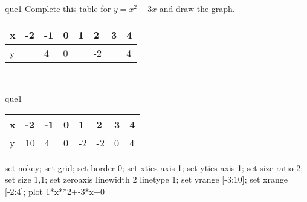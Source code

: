 \documentclass[13.5pt, varwidth=true]{beamer}
\begin{document}
\begin{frame}[shrink=19,fragile]
	\begin{beamercolorbox}[rounded=true, left, shadow=true,wd=14.8cm]{que1}
		 Complete this table for $y = x^{2} - 3x$ and draw the graph. \\[0.3cm] \renewcommand{\arraystretch}{1.2}\begin{tabular}{|C|C|C|C|C|C|C|C|} \hline x & -2 & -1 & 0 & 1 & 2 & 3 & 4 \\ \hline y &  & 4 & 0 &  & -2 &  & 4\\ \hline \end{tabular}\\[0.3cm]
	\end{beamercolorbox}
\end{frame}
\begin{frame}[shrink=19,fragile]
	\begin{beamercolorbox}[rounded=true, left, shadow=true,wd=14.8cm]{que1}
		\renewcommand{\arraystretch}{1.2}\begin{tabular}{|C|C|C|C|C|C|C|C|} \hline x & -2 & -1 & 0 & 1 & 2 & 3 & 4 \\ \hline y & 10 & 4 & 0 & -2 & -2 & 0 & 4\\ \hline \end{tabular}\begin{gnuplot}[terminal=pdf] set nokey; set grid; set border 0; set xtics axis 1; set ytics axis 1; set size ratio 2; set size 1,1; set zeroaxis linewidth 2 linetype 1; set yrange [-3:10]; set xrange [-2:4]; plot 1*x**2+-3*x+0 \end{gnuplot}
	\end{beamercolorbox}
\end{frame}
\end{document}
